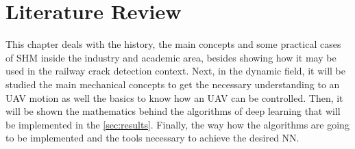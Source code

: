 \chapter{Literature Review}\label{sec:literature_review}

This chapter deals with the history, the main concepts and some practical cases of SHM inside the industry and academic area, besides showing how it may be used in the railway crack detection context.
Next, in the dynamic field, it will be studied the main mechanical concepts to get the necessary understanding to an UAV motion as well the basics to know how an UAV can be controlled.
Then, it will be shown the mathematics behind the algorithms of deep learning that will be implemented in the \cref{sec:results}. 
Finally, the way how the algorithms are going to be implemented and the tools necessary to achieve the desired NN.